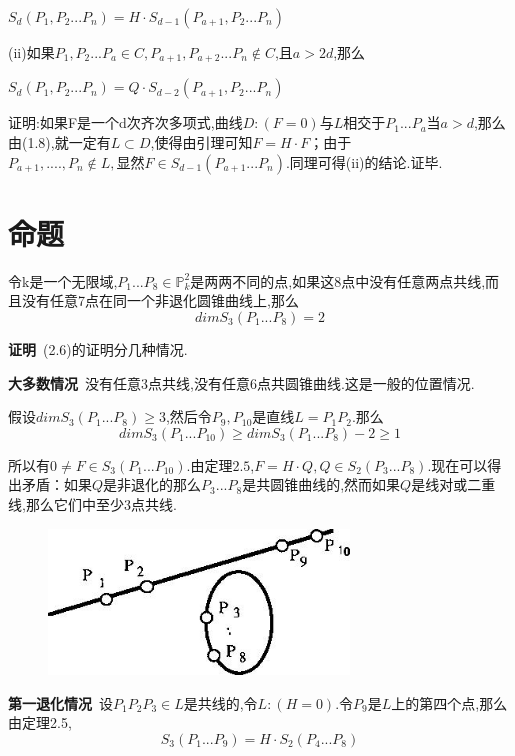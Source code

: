 \documentclass[UTF8]{book}
\begin{document}
		
		\quad $S_{d}(P_{1},P_{2} ... P_{n} )=H·S_{d-1}(P_{a+1},P_{2} ... P_{n})$
		
		(ii)如果$P_{1},P_{2} ... P_{a} \in C, P_{a+1},P_{a+2} ... P_{n} \notin C$,且$ a>2d $,那么
		
		
		\quad $S_{d}(P_{1},P_{2} ... P_{n} )=Q· S_{d-2}(P_{a+1},P_{2} ... P_{n})$
		
		
		证明:如果F是一个d次齐次多项式,曲线$ D:(F=0) $与$ L $相交于$P_{1}...P_{a}$当$ a>d $,那么由(1.8),就一定有$L\subset D$,使得由引理可知$ F=H·F $；由于$P_{a+1} ,...., P_{n} \notin L,显然F \in S_{d-1}(P_{a+1} ... P_{n})$.同理可得(ii)的结论.证毕.
	\section{命题}
		令k是一个无限域,$P_{1} ... P_{8} \in \mathbb{P}^{2}_{k}$是两两不同的点,如果这8点中没有任意两点共线,而且没有任意7点在同一个非退化圆锥曲线上,那么
		\begin{equation*}
		dimS_{3}(P_{1}...P_{8})=2
		\end{equation*}
		
		
		\textbf{证明}\ (2.6)的证明分几种情况.
		
		
		\textbf{大多数情况}\ 没有任意3点共线,没有任意6点共圆锥曲线.这是一般的位置情况.
		
		
		假设$dim S_{3}(P_{1}...P_{8})\ge 3$,然后令$P_{9},P_{10}$是直线$L=P_{1} P_{2}$.那么
		\begin{equation*}
		dim S_{3}(P_{1}...P_{10})\ge dim S_{3}(P_{1} ... P_{8} )-2 \ge 1
		\end{equation*}
		
		
		所以有$0 \ne F \in S_{3} (P_{1} ... P_{10} )$.由定理$ 2.5 $,$F=H·Q,Q \in S_{2} (P_{3} ... P_{8} )$.现在可以得出矛盾：如果$ Q $是非退化的那么$P_{3} ... P_{8}$是共圆锥曲线的,然而如果$ Q $是线对或二重线,那么它们中至少3点共线.
		\begin{figure}[H]
		  \centering
		  \includegraphics[width=8cm]{32.jpg}
		\end{figure}
	
	
		\textbf{第一退化情况}\ 设$P_{1} P_{2} P_{3} \in L$是共线的,令$ L:(H=0) $.令$P_{9}$是$ L $上的第四个点,那么由定理2.5,
		\begin{equation*}
		S_{3}(P_{1} ... P_{9} )=H· S_{2}(P_{4} ... P_{8} )
		\end{equation*}
		
\end{document}
